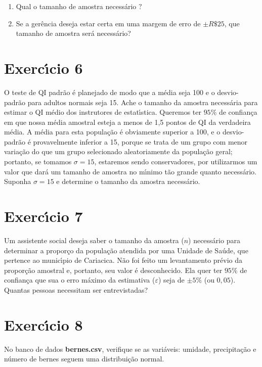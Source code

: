 \documentclass[a4paper,11pt,twoside,openright]{report}
\begin{document}
\begin{enumerate}
 \item Qual o tamanho de amostra necess\'{a}rio $?$
\item Se a ger\^{e}ncia deseja estar certa em uma margem de erro de $\pm R\$25$, que tamanho de amostra ser\'{a} necess\'{a}rio?
\end{enumerate}


\section*{Exerc\'{\i}cio 6}
\hspace{0.5cm} O teste de QI padr\~{a}o \'{e} planejado de modo que a m\'{e}dia seja 100 e o
desvio-padr\~{a}o para adultos normais seja 15. Ache o tamanho da amostra necess\'{a}ria para estimar 
o QI m\'{e}dio dos instrutores de estat\'{\i}stica. Queremos ter $95\%$ de confian\c{c}a em que nossa 
m\'{e}dia amostral esteja a menos de 1,5 pontos de QI da verdadeira m\'{e}dia. A m\'{e}dia para esta
popula\c{c}\~{a}o \'{e} obviamente superior a 100, e o desvio-padr\~{a}o \'{e} provavelmente
inferior a 15, porque se trata de um grupo com menor varia\c{c}\~{a}o do que um
grupo selecionado aleatoriamente da popula\c{c}\~{a}o geral; portanto, se
tomamos $\sigma = 15$, estaremos sendo conservadores, por utilizarmos um valor que dar\'{a} um tamanho de amostra no
 m\'{\i}nimo t\~{a}o grande quanto necess\'{a}rio. Suponha $\sigma = 15$ e determine o tamanho da amostra necess\'{a}rio.


\section*{Exerc\'{\i}cio 7}
\hspace{0.5cm}Um assistente social deseja saber o tamanho da amostra ($n$) necess\'{a}rio para determinar a
propor\c{c}o da popula\c{c}\~{a}o atendida por uma Unidade de Sa\'{u}de, que pertence ao munic\'{\i}pio de
Cariacica. N\~{a}o foi feito um levantamento pr\'{e}vio da propor\c{c}\~{a}o amostral e, portanto, seu valor \'{e}
desconhecido. Ela quer ter $95\%$ de confian\c{c}a que sua o erro m\'{a}ximo da estimativa ($\varepsilon$) seja
de $\pm 5\%$ (ou $0,05$). Quantas pessoas necessitam ser entrevistadas?

\section*{Exerc\'{\i}cio 8}
\hspace{0.5cm}No banco de dados \textbf{bernes.csv}, verifique se as vari\'{a}veis: umidade, precipita\c{c}\~{a}o e n\'{u}mero de bernes seguem uma distribui\c{c}\~{a}o normal.
\end{document}
